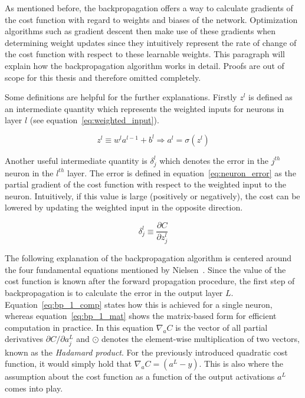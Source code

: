 As mentioned before, the backpropagation offers a way to calculate gradients
of the cost function with regard to weights and biases of the network.
Optimization algorithms such as gradient descent then make use of these 
gradients when determining weight updates since they intuitively represent
the rate of change of the cost function with respect to these learnable weights.
This paragraph will explain how the backpropagation algorithm works in detail.
Proofs are out of scope for this thesis and therefore omitted completely.

Some definitions are helpful for the further explanations. Firstly
$z^l$ is defined as an intermediate quantity which represents the weighted
inputs for neurons in layer $l$ (see equation~\ref{eq:weighted_input}).

\begin{equation}
  \label{eq:weighted_input}
  z^l \equiv w^l a^{l-1} + b^l \Rightarrow a^l = \sigma(z^l)
\end{equation}

Another useful intermediate quantity is $\delta_j^l$ which denotes the error
in the $j^{th}$ neuron in the $l^{th}$ layer. The error is defined in
equation~\ref{eq:neuron_error} as the partial gradient of the cost function
with respect to the weighted input to the neuron. Intuitively, if this value
is large (positively or negatively), the cost can be lowered by updating the 
weighted input in the opposite direction.

\begin{equation}
  \label{eq:neuron_error}
  \delta_j^l \equiv \frac{\partial C}{\partial z_j^l}
\end{equation}

The following explanation of the backpropagation algorithm is centered around
the four fundamental equations mentioned by Nielsen~\cite{Nielsen2015}.
Since the value of the cost function is known after the forward propagation
procedure, the first step of backpropagation is to calculate the error in the
output layer $L$.
Equation~\ref{eq:bp_1_comp} states how this is achieved for a single neuron,
whereas equation~\ref{eq:bp_1_mat} shows the matrix-based form for efficient
computation in practice. In this equation $\nabla_a C$ is the vector of all partial
derivatives $\partial C / \partial a_j^L$ and $\odot$ denotes the element-wise
multiplication of two vectors, known as the \textit{Hadamard product}.
For the previously introduced quadratic cost function, it would simply hold
that $\nabla_a C = (a^L -y)$.
This is also where the assumption about the cost function as a function of the
output activations $a^L$ comes into play.

